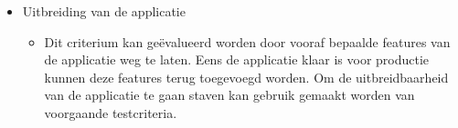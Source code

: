 \begin{itemize}
\begin{itemize}
    \end{itemize}
    \item Uitbreiding van de applicatie
    \begin{itemize}
        \item Dit criterium kan geëvalueerd worden door vooraf bepaalde features van de applicatie weg te laten. Eens de applicatie klaar is voor productie kunnen deze features terug toegevoegd worden. Om de uitbreidbaarheid van de applicatie te gaan staven kan gebruik gemaakt worden van voorgaande testcriteria.
    \end{itemize}
\end{itemize}
